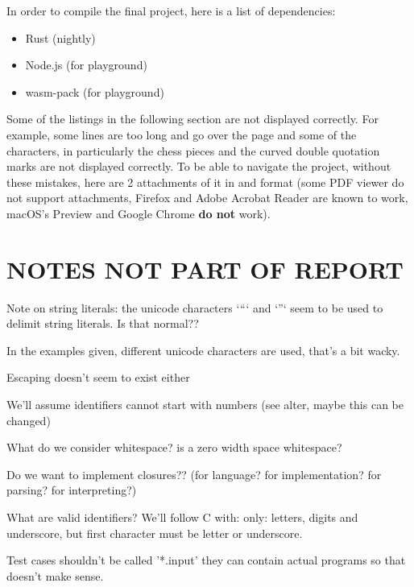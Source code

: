 \documentclass{article}
\begin{document}
In order to compile the final project, here is a list of dependencies:

\begin{itemize}
	\item Rust (nightly)
	\item Node.js (for playground)
	\item wasm-pack (for playground)
\end{itemize}

Some of the listings in the following section are not displayed correctly. For
example, some lines are too long and go over the page and some of the
characters, in particularly the chess pieces and the curved double quotation
marks are not displayed correctly. To be able to navigate the project, without
these mistakes, here are 2 attachments of it in
 and
 format (some PDF viewer do not
support attachments, Firefox and Adobe Acrobat Reader are known to work,
macOS's Preview and Google Chrome \textbf{do not} work).



\section{NOTES NOT PART OF REPORT}

Note on string literals: the unicode characters `“` and `”` seem to be used to
delimit string literals. Is that normal??

In the examples given, different unicode characters are used, that's a bit
wacky.

Escaping doesn't seem to exist either

We'll assume identifiers cannot start with numbers (see alter, maybe this can
be changed)

What do we consider whitespace? is a zero width space whitespace?

Do we want to implement closures?? (for language? for implementation? for parsing? for interpreting?)

What are valid identifiers? We'll follow C with: only: letters, digits and
underscore, but first character must be letter or underscore.

Test cases shouldn't be called '*.input' they can contain actual programs so
that doesn't make sense.

\end{document}
